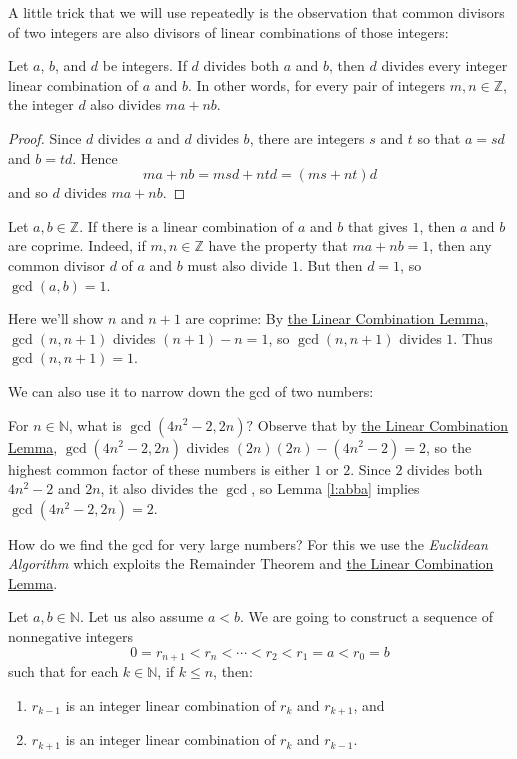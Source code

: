 \documentclass[11pt,dvipsnames]{book}
\def\Z{\mathbb{Z}}
\def\N{{\mathbb{N}}}
\numberwithin{equation}{section} %
\numberwithin{figure}{section} %
\numberwithin{table}{section} %
\begin{document}
A little trick that we will use repeatedly is the observation that common divisors of two integers are also divisors of linear combinations of those integers:

\begin{lemma}
\label{l:easy-lemma}
Let $a$, $b$, and $d$ be integers. If $d$ divides both $a$ and $b$, then $d$ divides every integer linear combination of $a$ and $b$.
In other words, for every pair of integers $m,n\in\mathbb{Z}$, the integer $d$ also divides $ma + nb$.
\end{lemma}

\begin{proof}
Since $d$ divides $a$ and $d$ divides $b$, there are integers $s$ and $t$ so that $a=sd$ and $b=td$.
Hence
\[
ma+nb=msd+ntd=(ms+nt)d\]
and so $d$ divides $ma+nb$.
\end{proof}

\def\easylemma{\hyperref[l:easy-lemma]{the Linear Combination Lemma}}

\begin{example}
Let $a, b \in \Z$.
If there is a linear combination of $a$ and $b$ that gives $1$, then $a$ and $b$ are coprime.
Indeed, if $m,n \in \Z$ have the property that $ma+nb = 1$, then any common divisor $d$ of $a$ and $b$ must also divide $1$. But then $d=1$, so $\gcd(a,b)=1$.

Here we'll show $n$ and $n+1$ are coprime: By \easylemma, $\gcd(n,n+1)$ divides $(n+1)-n=1$, so $\gcd(n,n+1)$ divides $1$. Thus $\gcd(n,n+1)=1$. 
\end{example}

We can also use it to narrow down the gcd of two numbers:

\begin{example}
For $n\in\mathbb{N}$, what is $\gcd(4n^2-2,2n)?$ Observe that by \easylemma, $\gcd(4n^2-2,2n)$ divides $(2n)(2n)-(4n^2-2)=2$, so the highest common factor of these numbers is either $1$ or $2$. Since $2$ divides both $4n^2-2$ and $2n$, it also divides the $\gcd$, so Lemma \ref{l:abba} implies $\gcd(4n^2-2,2n)=2$.
\end{example}

How do we find the gcd for very large numbers? For this we use the {\it Euclidean Algorithm} which exploits the Remainder Theorem and \easylemma.

Let $a,b\in\N$. Let us also assume $a<b$. 
We are going to construct a sequence of nonnegative integers
\[
0 = r_{n+1} < r_n < \cdots < r_2 < r_1 = a < r_0 = b
\]
such that for each $k \in \N$, if $k\leq n$, then:
\begin{enumerate}
    \item $r_{k-1}$ is an integer linear combination of $r_k$ and $r_{k+1}$, and
    \item $r_{k+1}$ is an integer linear combination of $r_k$ and $r_{k-1}$.
\end{enumerate}
\end{document}
